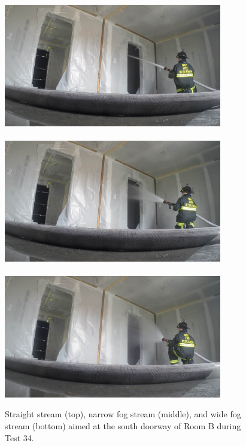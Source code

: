 \documentclass[12pt,oneside]{book}
\begin{document}
\begin{figure}[!ht]
\includegraphics[trim=23cm 6.5cm 4cm 6cm, clip=true, width=3.75in]{../Pictures/SS_Room_B_Test_34}
\\~\\
\includegraphics[trim=23cm 6.5cm 4cm 6cm, clip=true, width=3.75in]{../Pictures/NF_Room_B_Test_34}
\\~\\
\includegraphics[trim=23cm 6.5cm 4cm 6cm, clip=true, width=3.75in]{../Pictures/WF_Room_B_Test_34}
\caption[Straight stream, narrow fog stream, and wide fog stream during Test 34.]{Straight stream (top), narrow fog stream (middle), and wide fog stream (bottom) aimed at the south doorway of Room B during Test 34.}
\label{fig:test_34_pic}
\end{figure}
\end{document}
